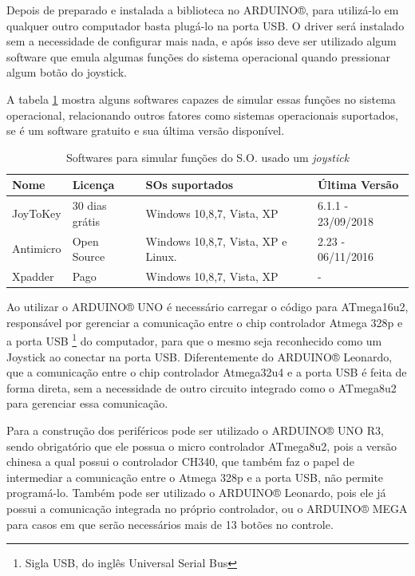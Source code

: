 \documentclass[
	12pt,			%
	openright,		%
	oneside,			%
	a4paper,			%
	chapter=TITLE,		%
	english,			%
	brazil,			%
	]{abntex2}
\begin{document}
Depois de preparado e instalada a biblioteca no ARDUINO®, para utilizá-lo em qualquer outro computador basta plugá-lo na porta USB. O driver será instalado sem a necessidade de configurar mais nada, e após isso deve ser utilizado algum software que emula algumas funções do sistema operacional quando pressionar algum botão do joystick.

A tabela \ref{tab:tab-3} mostra alguns softwares capazes de simular essas funções no sistema operacional, relacionando outros fatores como sistemas operacionais suportados, se é um software gratuito e sua última versão disponível.

\begin{table}[H]
\caption{Softwares para simular funções do S.O. usado um \emph{joystick}}
\label{tab:tab-3}
{
\centering
\footnotesize
\begin{tabular}{|p{2cm}|p{3cm}|p{6cm}|p{3cm}|}
\hline
\textbf{Nome} & \textbf{Licença} & \textbf{SOs suportados} & \textbf{Última Versão}\\
\hline
JoyToKey	&30 dias grátis				&Windows 10,8,7, Vista, XP		&6.1.1 - 23/09/2018\\
\hline
Antimicro	&Open Source				&Windows 10,8,7, Vista, XP e Linux.	&2.23 - 06/11/2016\\
\hline
Xpadder	&Pago						&Windows 10,8,7, Vista, XP 		&-\\
\hline
\end{tabular}
}
\end{table}

Ao utilizar o ARDUINO® UNO é necessário carregar o código para ATmega16u2, responsável por gerenciar a comunicação entre o chip controlador Atmega 328p e a porta USB \footnote{Sigla USB, do inglês Universal Serial Bus} do computador, para que o mesmo seja reconhecido como um Joystick ao conectar na porta USB. Diferentemente do ARDUINO® Leonardo, que a comunicação entre o chip controlador Atmega32u4 e a porta USB é feita de forma direta, sem a necessidade de outro circuito integrado como o ATmega8u2 para gerenciar essa comunicação.

Para a construção dos periféricos pode ser utilizado o ARDUINO® UNO R3, sendo obrigatório que ele possua o micro controlador ATmega8u2, pois a versão chinesa a qual possui o controlador CH340, que também faz o papel de intermediar a comunicação entre o Atmega 328p e a porta USB, não permite programá-lo. Também pode ser utilizado o ARDUINO® Leonardo, pois ele já possui a comunicação integrada no próprio controlador, ou o ARDUINO® MEGA para casos em que serão necessários mais de 13 botões no controle.
\end{document}
